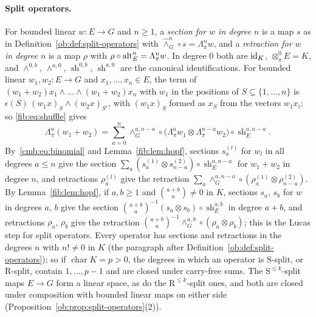 \paragraph{Split operators.}
For bounded linear $w\colon E\to G$ and $n\ge1$, a \emph{section for $w$ in degree $n$} is a map $s$ as in
Definition~\ref{ob:def:split-operators} with $\widehat\wedge^n_G\circ s=\Lambda^n_\pi w$, and a \emph{retraction for $w$
in degree $n$} is a map $\rho$ with $\rho\circ\operatorname{alt}^n_E=\Lambda^n_\pi w$. In degree $0$ both are $\mathrm{id}_K$,
$\otimes^0_\pi E=K$, and $\wedge^{0,b}$, $\wedge^{a,0}$, $\operatorname{sh}^{0,b}$, $\operatorname{sh}^{a,0}$ are the
canonical identifications. For bounded linear $w_1,w_2\colon E\to G$ and $x_1,\dots,x_n\in E$, the term of
$(w_1+w_2)x_1\wedge\dots\wedge(w_1+w_2)x_n$ with $w_1$ in the positions of $S\subseteq\{1,\dots,n\}$ is
$\epsilon(S)\,(w_1x)_S\wedge(w_2x)_{S^c}$, with $(w_1x)_S$ formed as $x_S$ from the vectors $w_1x_i$; so
\eqref{fib:eq:shuffle} gives
\begin{equation}\label{cmb:eq:binomial}
 \Lambda^n_\pi(w_1+w_2)=\sum_{a=0}^n\wedge^{a,n-a}_G\circ\bigl(\Lambda^a_\pi w_1\otimes\Lambda^{n-a}_\pi w_2\bigr)\circ
 \operatorname{sh}^{a,n-a}_E .
\end{equation}
By~\eqref{cmb:eq:binomial} and Lemma~\ref{fib:lem:hopf}, sections $s^{(l)}_a$ for $w_l$ in all degrees $a\le n$ give the
section $\sum_a(s^{(1)}_a\otimes s^{(2)}_{n-a})\circ\operatorname{sh}^{a,n-a}_E$ for $w_1+w_2$ in degree $n$, and
retractions $\rho^{(l)}_a$ give the retraction $\sum_a\wedge^{a,n-a}_G\circ(\rho^{(1)}_a\otimes\rho^{(2)}_{n-a})$. By
Lemma~\ref{fib:lem:hopf}, if $a,b\ge1$ and $\binom{a+b}a\ne0$ in $K$, sections $s_a$, $s_b$ for $w$ in degrees $a$, $b$
give the section $\binom{a+b}a^{-1}(s_a\otimes s_b)\circ\operatorname{sh}^{a,b}_E$ in degree $a+b$, and retractions
$\rho_a$, $\rho_b$ give the retraction $\binom{a+b}a^{-1}\wedge^{a,b}_G\circ(\rho_a\otimes\rho_b)$; this is the Lucas step
for split operators. Every operator has sections and retractions in the degrees $n$ with $n!\ne0$ in $K$ (the paragraph
after Definition~\ref{ob:def:split-operators}); so if $\operatorname{char}K=p>0$, the degrees in which an operator is
$\mathrm S$-split, or $\mathrm R$-split, contain $1,\dots,p-1$ and are closed under carry-free sums. The
$\mathrm S^{\le k}$-split maps $E\to G$ form a linear space, as do the $\mathrm R^{\le k}$-split ones, and both are closed
under composition with bounded linear maps on either side (Proposition~\ref{ob:prop:split-operators}(2)).

